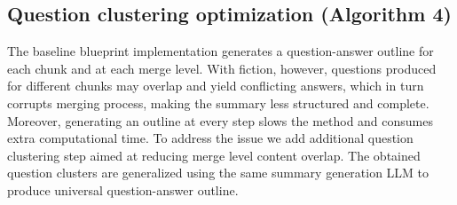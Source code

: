 \documentclass{superfri}
\begin{document}
\subsection{Question clustering optimization (Algorithm 4)}
The baseline blueprint implementation generates a question-answer outline for each chunk and at each merge level. 
With fiction, however, questions produced for different chunks may overlap and yield conflicting answers, which in turn corrupts merging process, 
making the summary less structured and complete. 
Moreover, generating an outline at every step slows the method and consumes extra computational time.
To address the issue we add additional question clustering step aimed at reducing merge level content overlap. 
The obtained question clusters are generalized using the same summary generation LLM to produce universal question-answer outline.
\end{document}
